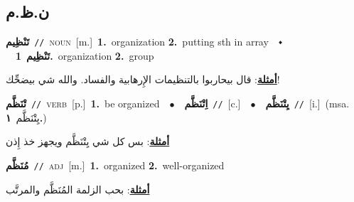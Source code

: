 \documentclass[10pt,a4paper,twoside]{article} %
\begin{document}
\begin{multicols}{2}
\vspace{-3mm}
\subsection*{\color{blue}\foreignlanguage{arabic}{ن.ظ.م}\color{blue}{}} 

{\setlength\topsep{0pt}\textbf{\foreignlanguage{arabic}{تَنْظِيم}}\ {\color{gray}\texttt{//}\color{black}}\ \textsc{noun}\ [m.]\ \textbf{1.}~organization  \textbf{2.}~putting sth in array\ \ $\smblkdiamond$\ \ \setlength\topsep{0pt}\textbf{\foreignlanguage{arabic}{تَنْظِيم}}\ \textbf{1.}~organization  \textbf{2.}~group\  \begin{flushright}\color{gray}\foreignlanguage{arabic}{\textbf{\underline{\foreignlanguage{arabic}{أمثلة}}}: قال بيحاربوا بالتنظيمات الإِرهابية والفساد. والله شي بيضحِّك!}\end{flushright}\color{black}} \vspace{2mm}

{\setlength\topsep{0pt}\textbf{\foreignlanguage{arabic}{تْنَظَّم}}\ {\color{gray}\texttt{//}\color{black}}\ \textsc{verb}\ [p.]\ \textbf{1.}~be organized\ \ $\bullet$\ \ \setlength\topsep{0pt}\textbf{\foreignlanguage{arabic}{اِتْنَظَّم}}\ {\color{gray}\texttt{//}\color{black}}\ [c.]\ \ $\bullet$\ \ \setlength\topsep{0pt}\textbf{\foreignlanguage{arabic}{يِتْنَظَّم}}\ {\color{gray}\texttt{//}\color{black}}\ [i.]\ \color{gray}(msa. \foreignlanguage{arabic}{يِتْنَظَّم}~\foreignlanguage{arabic}{\textbf{١.}})\color{black}\  \begin{flushright}\color{gray}\foreignlanguage{arabic}{\textbf{\underline{\foreignlanguage{arabic}{أمثلة}}}: بس كل شي يِتْنَظَّم ويجهز خذ إِذن}\end{flushright}\color{black}} \vspace{2mm}

{\setlength\topsep{0pt}\textbf{\foreignlanguage{arabic}{مُنَظَّم}}\ {\color{gray}\texttt{//}\color{black}}\ \textsc{adj}\ [m.]\ \textbf{1.}~organized  \textbf{2.}~well-organized\  \begin{flushright}\color{gray}\foreignlanguage{arabic}{\textbf{\underline{\foreignlanguage{arabic}{أمثلة}}}: بحب الزلمة المُنَظَّم والمرتَّب}\end{flushright}\color{black}} \vspace{2mm}


\end{multicols}
\end{document}

